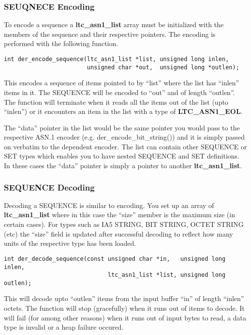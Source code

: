 \documentclass[a4paper]{book}
\begin{document}
\subsubsection{SEUQNECE Encoding}
To encode a sequence a \textbf{ltc\_asn1\_list} array must be initialized with the members of the sequence and their respective pointers.  The encoding is performed
with the following function.

\begin{verbatim}
int der_encode_sequence(ltc_asn1_list *list, unsigned long inlen,
                        unsigned char *out,  unsigned long *outlen);
\end{verbatim}
This encodes a sequence of items pointed to by ``list'' where the list has ``inlen'' items in it.  The SEQUENCE will be encoded to ``out'' and of length ``outlen''.  The
function will terminate when it reads all the items out of the list (upto ``inlen'') or it encounters an item in the list with a type of \textbf{LTC\_ASN1\_EOL}.

The ``data'' pointer in the list would be the same pointer you would pass to the respective ASN.1 encoder (e.g. der\_encode\_bit\_string()) and it is simply passed on
verbatim to the dependent encoder.  The list can contain other SEQUENCE or SET types which enables you to have nested SEQUENCE and SET definitions.  In these cases
the ``data'' pointer is simply a pointer to another \textbf{ltc\_asn1\_list}.

\subsubsection{SEQUENCE Decoding}


Decoding a SEQUENCE is similar to encoding.  You set up an array of \textbf{ltc\_asn1\_list} where in this case the ``size'' member is the maximum size 
(in certain cases).  For types such as IA5 STRING, BIT STRING, OCTET STRING (etc) the ``size'' field is updated after successful decoding to reflect how many
units of the respective type has been loaded.  

\begin{verbatim}
int der_decode_sequence(const unsigned char *in,   unsigned long  inlen,
                              ltc_asn1_list *list, unsigned long  outlen);
\end{verbatim}

This will decode upto ``outlen'' items from the input buffer ``in'' of length ``inlen'' octets.  The function will stop (gracefully) when it runs out of items to decode.
It will fail (for among other reasons) when it runs out of input bytes to read, a data type is invalid or a heap failure occured.
\end{document}
